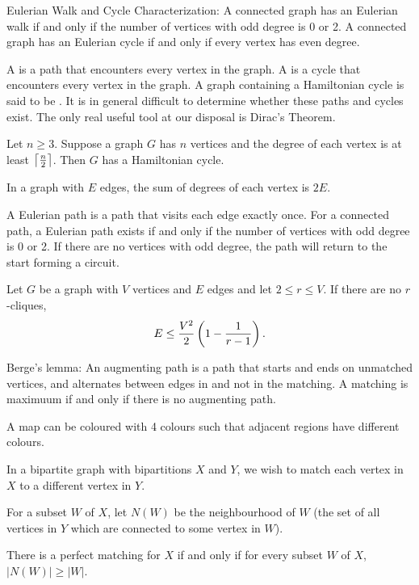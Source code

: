 Eulerian Walk and Cycle Characterization: A connected graph has an Eulerian walk if and only if the number of vertices with odd degree is 0 or 2. A connected graph has an Eulerian cycle if and only if every vertex has even degree.

A  is a path that encounters every vertex in the graph. A  is a cycle that encounters every vertex in the graph. A graph containing a Hamiltonian cycle is said to be . It is in general difficult to determine whether these paths and cycles exist. The only real useful tool at our disposal is Dirac's Theorem.

\begin{theorem}
Let $n\ge 3$. Suppose a graph $G$ has $n$ vertices and the degree of each vertex is at least $\left\lceil \frac{n}{2} \right\rceil$. Then $G$ has a Hamiltonian cycle.
\end{theorem}




In a graph with $E$ edges, the sum of degrees of each vertex is $2E$.

A Eulerian path is a path that visits each edge exactly once. 
For a connected path, a Eulerian path exists if and only if the number of vertices with odd degree is 0 or 2.
If there are no vertices with odd degree, the path will return to the start forming a circuit.

\begin{theorem}
Let $G$ be a graph with $V$ vertices and $E$ edges and let $2\le r\le V$. If there are no $r$-cliques,
\[ E\le\frac{V^2}{2}\left(1-\frac{1}{r-1}\right). \]
\end{theorem}

Berge's lemma:
An augmenting path is a path that starts and ends on unmatched vertices, and alternates between edges in and not in the matching.
A matching is maximuum if and only if there is no augmenting path.

\begin{theorem}
A map can be coloured with 4 colours such that adjacent regions have different colours.
\end{theorem}

\begin{theorem}
In a bipartite graph with bipartitions $X$ and $Y$, we wish to match each vertex in $X$ to a different vertex in $Y$.

For a subset $W$ of $X$, let $N(W)$ be the neighbourhood of $W$ (the set of all vertices in $Y$ which are connected to some vertex in $W$).

There is a perfect matching for $X$ if and only if for every subset $W$ of $X$, $|N(W)|\ge|W|$.
\end{theorem}

